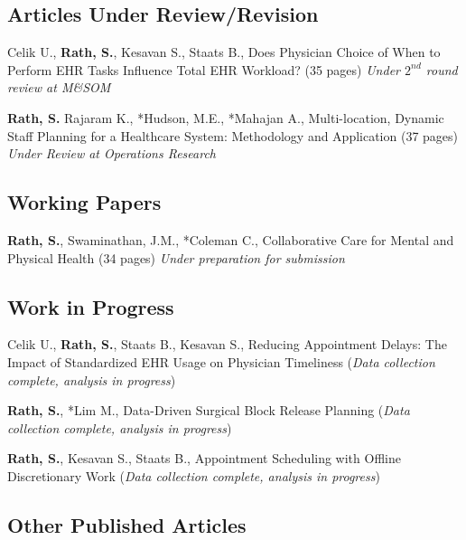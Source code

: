 \documentclass[11pt,a4paper]{article}
\renewenvironment{itemize}{
	\begin{list}{}{
			\setlength{\leftmargin}{1.5em}
		}
	}{
\end{list}
}
\begin{document}
\subsection*{Articles Under Review/Revision}
\begin{itemize}
\item Celik U., \textbf{Rath, S.}, Kesavan S., Staats B., Does Physician Choice of When to Perform EHR Tasks Influence Total EHR Workload? (35 pages) \emph{Under $2^{nd}$ round review at M\&SOM}
\item \textbf{Rath, S.} Rajaram K., *Hudson, M.E., *Mahajan A., Multi-location, Dynamic Staff Planning for a Healthcare System: Methodology and Application (37 pages) \emph{Under Review at Operations Research}
	

\end{itemize}

\subsection*{Working Papers}
\begin{itemize}
	\item \textbf{Rath, S.}, Swaminathan, J.M., *Coleman C., Collaborative Care for Mental and Physical Health (34 pages) \emph{Under preparation for submission}
	
\end{itemize}

\subsection*{Work in Progress}

\begin{itemize}
	\item Celik U., \textbf{Rath, S.}, Staats B., Kesavan S.,  Reducing Appointment Delays: The Impact of 
	Standardized EHR Usage on Physician Timeliness (\emph{Data collection complete, analysis in progress})
	\item \textbf{Rath, S.}, *Lim M., Data-Driven Surgical Block Release Planning (\emph{Data collection complete, analysis in progress})
	\item \textbf{Rath, S.}, Kesavan S.,   Staats B., Appointment Scheduling with Offline Discretionary Work (\emph{Data collection complete, analysis in progress})
\end{itemize}
\subsection*{Other Published Articles}
\end{document}
